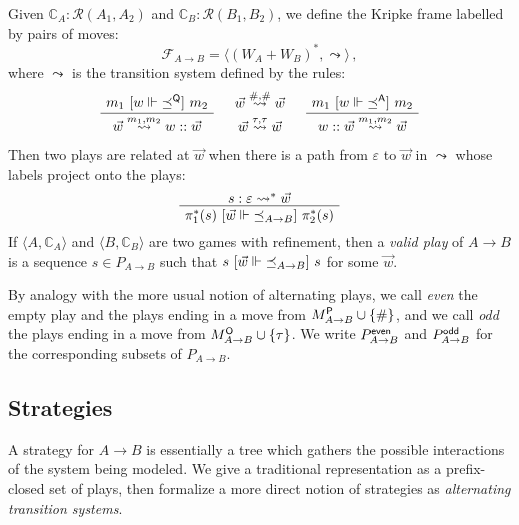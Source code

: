 \begin{definition}
Given
$\mathbb{C}_A : \mathcal{R}(A_1, A_2)$ and
$\mathbb{C}_B : \mathcal{R}(B_1, B_2)$,
we define the Kripke frame
labelled by pairs of moves:
\[
    \mathcal{F}_{A \rightarrow B} =
      \langle (W_A + W_B)^*, \leadsto \rangle \,,
\]
where $\leadsto$ is the transition system
defined by the rules:
\[
    \AxiomC{$m_1 \ifr{w \Vdash {\preceq}^\kw{Q}} m_2$}
    \UnaryInfC{$\vec{w} \stackrel{m_1, m_2}{\leadsto} w :: \vec{w}$}
    \DisplayProof
    \quad
    \begin{array}{c}
      \vec{w} \stackrel{\#,\#}{\leadsto} \vec{w} \\[0.7ex]
      \vec{w} \stackrel{\tau, \tau}{\leadsto} \vec{w}
    \end{array}
    \quad
    \AxiomC{$m_1 \ifr{w \Vdash {\preceq}^\kw{A}} m_2$}
    \UnaryInfC{$w :: \vec{w} \stackrel{m_1, m_2}{\leadsto} \vec{w}$}
    \DisplayProof
\]
Then two plays are related at $\vec{w}$
when there is a path from $\varepsilon$ to $\vec{w}$
in $\leadsto$ whose labels project onto the plays:
\[
    \AxiomC{$s : \varepsilon \leadsto^* \vec{w}$}
    \UnaryInfC{$\pi_1^*(s)
       \ifr{\vec{w} \Vdash {\preceq}_{A \rightarrow B}}
       \pi_2^*(s)$}
    \DisplayProof
\]
If
$\langle A, \mathbb{C}_A \rangle$ and
$\langle B, \mathbb{C}_B \rangle$
are two games with refinement, then
a \emph{valid play} of $A \rightarrow B$
is a sequence $s \in P_{A \rightarrow B}$
such that $s \ [{\vec{w} \Vdash {\preceq}_{A \rightarrow B}}]\  s$
for some $\vec{w}$.
\end{definition}

By analogy with the more usual notion of alternating plays,
we call \emph{even}
the empty play and the plays ending in
a move from $M_{A \rightarrow B}^{ \mathsf{P} } \cup \{\#\}$, and
we call \emph{odd} the plays ending in
a move from $M_{A \rightarrow B}^{ \mathsf{O} } \cup \{\tau\}$.
We write $P_{A \rightarrow B}^{ \mathsf{even} }$ and $P_{A \rightarrow B}^{ \mathsf{odd} }$
for the corresponding subsets of $P_{A \rightarrow B}$.

\subsection{Strategies}

A strategy for $A \rightarrow B$
is essentially a tree
which gathers the possible interactions of
the system being modeled.
We give a traditional representation
as a prefix-closed set of plays,
then formalize a more direct notion of strategies as
\emph{alternating transition systems}.

